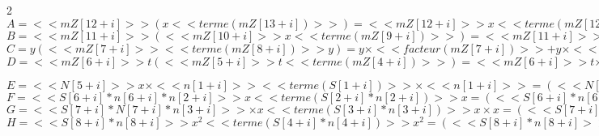 \begin{correction}
\begin{multicols}{2}
$A=  <<mZ[12+i]>> (x  <<terme(mZ[13+i])>>)=  <<mZ[12+i]>> x <<terme(mZ[12+i])>> \times <<facteur(mZ[13+i])>>=  <<mZ[12+i]>> x <<terme(mZ[12+i] * mZ[13+i])>>$\\
$B= <<mZ[11+i]>> ( <<mZ[10+i]>> x    <<terme(mZ[9+i])>>)= <<mZ[11+i]>> \times <<facteur(mZ[10+i])>> x  <<terme(mZ[11+i])>> \times  <<facteur(mZ[9+i])>>= <<mZ[11+i] * mZ[10+i]>> x  <<terme(mZ[11+i]*mZ[9+i])>>$\\
$C=y( <<mZ[7+i]>>  <<terme(mZ[8+i])>> y)=y \times <<facteur(mZ[7+i])>> + y \times <<mZ[8+i]>> y=<<mZ[7+i]>> y + <<mZ[8+i]>> y^2$\\
$D= <<mZ[6+i]>>  t(  <<mZ[5+i]>> t <<terme(mZ[4+i])>>)= <<mZ[6+i]>>  t \times <<facteur(mZ[5+i])>> t <<terme(mZ[6+i])>>  t \times <<facteur(mZ[4+i])>> = <<mZ[6+i]*mZ[5+i]>>  t^2  <<terme(mZ[6+i]*mZ[4+i])>>  t  $




$E=  <<N[5+i]>>x \times <<n[1+i]>>   <<terme(S[1+i])>> \times  <<n[1+i]>> =   (<<N[5+i]>>  x  <<terme(S[1+i])>> ) \times <<n[1+i]>> $\\
$F=  <<S[6+i] *n[6+i]*n[2+i]>>  x  <<terme(S[2+i]*n[2+i])>>  x=  (<<S[6+i] *n[6+i]*n[2+i]>>   <<terme(S[2+i]*n[2+i])>> ) \times  x=  <<S[6+i] *n[6+i]*n[2+i]+S[2+i]*n[2+i]>>  x$\\
$G=  <<S[7+i] *N[7+i] * n[3+i]>> \times  x  <<terme(S[3+i] * n[3+i])>> x\times x=  (<<S[7+i] *N[7+i] * n[3+i]>>   <<terme(S[3+i] * n[3+i])>> x) \times  x$\\
$H=  <<S[8+i] *n[8+i] >> x^2  <<terme(S[4+i] *n[4+i] )>> x^2=  (<<S[8+i] *n[8+i] >> <<terme(S[4+i] *n[4+i] )>>) x^2=  <<S[8+i] *n[8+i] + S[4+i] *n[4+i] >> x^2$

\end{multicols}

\exon{}


\end{correction}
